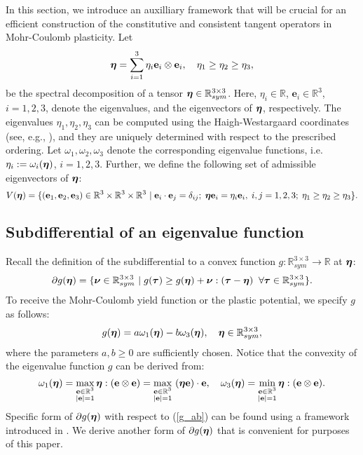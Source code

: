 \documentclass[a4paper,12pt]{article}
\theoremstyle{remark}
\newcommand{\mbf}[1]{\mbox{\boldmath$#1$}}
\numberwithin{equation}{section}
\begin{document}
In this section, we introduce an auxilliary framework that will be crucial for an efficient construction of the constitutive and consistent tangent operators in Mohr-Coulomb plasticity. Let
\begin{equation}
\mbf\eta=\sum_{i=1}^3 \eta_i\mathbf e_i\otimes\mathbf e_i,\quad \eta_1\geq \eta_2\geq \eta_3,
\label{spectrum}
\end{equation}
be the spectral decomposition of a tensor $\mbf\eta\in\mathbb R^{3\times3}_{sym}$. Here, $\eta_i\in\mathbb R$, $\mathbf e_i\in\mathbb R^3$, $i=1,2,3$, denote the eigenvalues, and the eigenvectors of $\mbf\eta$, respectively. The eigenvalues  $\eta_1,\eta_2,\eta_3$ can be computed using the Haigh-Westargaard coordinates (see, e.g., \cite[Appendix A]{NPO08}), and they are uniquely determined with respect to the prescribed ordering. Let $\omega_1,\omega_2,\omega_3$ denote the corresponding eigenvalue functions, i.e. $\eta_i:=\omega_i(\mbf\eta)$, $i=1,2,3$. Further, we define the following set of admissible eigenvectors of $\mbf\eta$: 
$$V(\mbf\eta)=\{(\mathbf e_1,\mathbf e_2,\mathbf e_3)\in \mathbb R^3\times\mathbb R^3\times\mathbb R^3\ |\; \mathbf e_i\cdot\mathbf e_j=\delta_{ij};\; \mbf\eta\mathbf e_i=\eta_i\mathbf e_i,\; i,j =1,2,3;\; \eta_1\geq \eta_2\geq \eta_3\}.$$

\subsection{Subdifferential of an eigenvalue function}
\label{subsec_subdif}

Recall the definition of the subdifferential to a convex function $g:\mathbb R^{3\times 3}_{sym}\rightarrow \mathbb R$ at $\mbf\eta$:
$$
\partial g(\mbf\eta)=\{\mbf\nu\in\mathbb R^{3\times 3}_{sym}\ |\;  g(\mbf\tau)\geq g(\mbf\eta)+\mbf\nu:(\mbf\tau-\mbf\eta)\;\;\forall \mbf\tau\in\mathbb R^{3\times 3}_{sym}\}.
$$
To receive the Mohr-Coulomb yield function or the plastic potential, we specify $g$ as follows:
\begin{equation}
g(\mbf\eta)=a\omega_1(\mbf\eta)-b\omega_3(\mbf\eta),\quad  \mbf\eta\in\mathbb R^{3\times3}_{sym},
\label{g_ab}
\end{equation}
where the parameters $a,b\geq0$ are sufficiently chosen. Notice that the convexity of the eigenvalue function $g$ can be derived from:
\begin{equation}
\omega_1(\mbf\eta)=\max_{\substack{\mathbf e\in\mathbb R^3\\ |\mathbf e|=1}}\mbf\eta:(\mathbf e\otimes\mathbf e)=\max_{\substack{\mathbf e\in\mathbb R^3\\ |\mathbf e|=1}}\ (\mbf\eta\mathbf e)\cdot\mathbf e,\quad\omega_3(\mbf\eta)=\min_{\substack{\mathbf e\in\mathbb R^3\\ |\mathbf e|=1}}\mbf\eta:(\mathbf e\otimes\mathbf e).
\label{eig_maxmin}
\end{equation}
Specific form of $\partial g(\mbf\eta)$ with respect to (\ref{g_ab}) can be found using a framework introduced in \cite[Chapter 2]{Ru06}. We derive another form of $\partial g(\mbf\eta)$ that is convenient for purposes of this paper.
\end{document}

